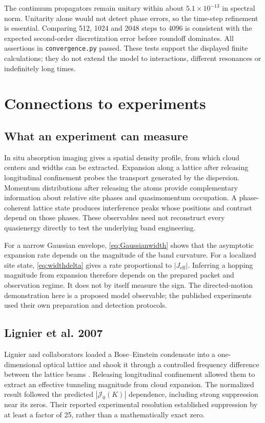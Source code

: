 \documentclass[11pt,oneside]{report}
\numberwithin{equation}{chapter}
\newcommand{\Jeff}{J_{\mathrm{eff}}}
\begin{document}
The continuum propagators remain unitary within about $5.1\times10^{-13}$ in spectral norm. Unitarity alone would not detect phase errors, so the time-step refinement is essential. Comparing 512, 1024 and 2048 steps to 4096 is consistent with the expected second-order discretization error before roundoff dominates. All assertions in \texttt{convergence.py} passed. These tests support the displayed finite calculations; they do not extend the model to interactions, different resonances or indefinitely long times.

\chapter{Connections to experiments}
\section{What an experiment can measure}
In situ absorption imaging gives a spatial density profile, from which cloud centers and widths can be extracted. Expansion along a lattice after releasing longitudinal confinement probes the transport generated by the dispersion. Momentum distributions after releasing the atoms provide complementary information about relative site phases and quasimomentum occupation. A phase-coherent lattice state produces interference peaks whose positions and contrast depend on those phases. These observables need not reconstruct every quasienergy directly to test the underlying band engineering.

For a narrow Gaussian envelope, \cref{eq:Gaussianwidth} shows that the asymptotic expansion rate depends on the magnitude of the band curvature. For a localized site state, \cref{eq:widthdelta} gives a rate proportional to $|\Jeff|$. Inferring a hopping magnitude from expansion therefore depends on the prepared packet and observation regime. It does not by itself measure the sign. The directed-motion demonstration here is a proposed model observable; the published experiments used their own preparation and detection protocols.

\section{Lignier et al. 2007}
Lignier and collaborators loaded a Bose--Einstein condensate into a one-dimensional optical lattice and shook it through a controlled frequency difference between the lattice beams \cite{Lignier2007}. Releasing longitudinal confinement allowed them to extract an effective tunneling magnitude from cloud expansion. The normalized result followed the predicted $|\mathcal J_0(K)|$ dependence, including strong suppression near its zeros. Their reported experimental resolution established suppression by at least a factor of 25, rather than a mathematically exact zero.
\end{document}
